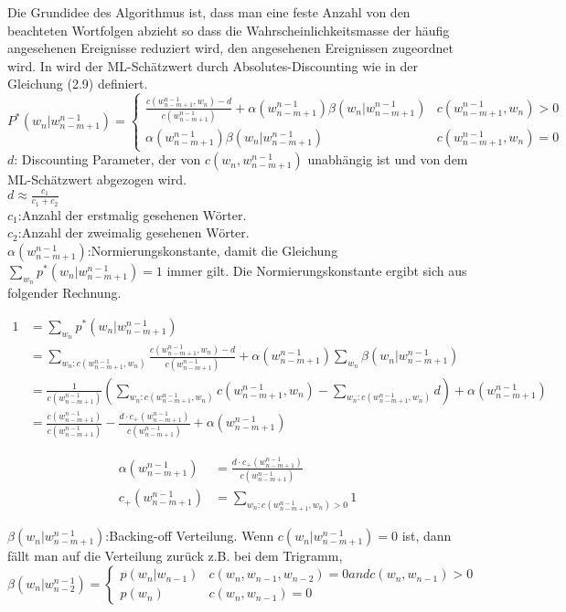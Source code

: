 Die Grundidee des Algorithmus ist, dass man eine feste Anzahl von den beachteten Wortfolgen abzieht so dass die Wahrscheinlichkeitsmasse der h\"aufig angesehenen Ereignisse reduziert wird, den angesehenen Ereignissen zugeordnet wird. In \cite{ars_script} wird der ML-Sch\"atzwert durch Absolutes-Discounting wie in der Gleichung (2.9) definiert.
\begin{equation}
P^{*}(w_{n}|w_{n-m+1}^{n-1})=\begin{cases}
\frac{c(w_{n-m+1}^{n-1},w_{n})-d}{c(w_{n-m+1}^{n-1})}+\alpha (w_{n-m+1}^{n-1})\beta (w_{n}|w_{n-m+1}^{n-1}) & c(w_{n-m+1}^{n-1},w_{n})>0 \\
\alpha (w_{n-m+1}^{n-1})\beta (w_{n}|w_{n-m+1}^{n-1}) & c(w_{n-m+1}^{n-1},w_{n})=0 
\end{cases}
\end{equation}
$d$: Discounting Parameter, der von $c(w_{n},w_{n-m+1}^{n-1})$ unabh\"angig ist und von dem ML-Sch\"atzwert abgezogen wird.\\
$d\approx \frac{c_{1}}{c_{1}+c_{2}}$ \\
$c_{1}$:Anzahl der erstmalig gesehenen W\"orter.\\
$c_{2}$:Anzahl der zweimalig gesehenen W\"orter.\\
$\alpha (w_{n-m+1}^{n-1})$:Normierungskonstante, damit die Gleichung $\sum_{w_{n}}p^{*}(w_{n}|w_{n-m+1}^{n-1})=1$ immer gilt. Die Normierungskonstante ergibt sich aus folgender Rechnung.

\begin{align}
1 &=\sum_{w_{n}}p^{*}(w_{n}|w_{n-m+1}^{n-1})\nonumber\\
&=\sum_{w_{n}:c(w_{n-m+1}^{n-1},w_{n})}\frac{c(w_{n-m+1}^{n-1},w_{n})-d}{c(w_{n-m+1}^{n-1})}+\alpha(w_{n-m+1}^{n-1})\sum_{w_{n}}\beta (w_{n}|w_{n-m+1}^{n-1}) \nonumber\\
&=\frac{1}{c(w_{n-m+1}^{n-1})}(\sum_{w_{n}:c(w_{n-m+1}^{n-1},w_{n})}c(w_{n-m+1}^{n-1},w_{n})-\sum_{w_{n}:c(w_{n-m+1}^{n-1},w_{n})}d)+\alpha (w_{n-m+1}^{n-1}) \nonumber\\
&=\frac{c(w_{n-m+1}^{n-1})}{c(w_{n-m+1}^{n-1})}-\frac{d\cdot c_{+}(w_{n-m+1}^{n-1})}{c(w_{n-m+1}^{n-1})}+\alpha (w_{n-m+1}^{n-1})
\end{align}

\begin{align}
\alpha (w_{n-m+1}^{n-1}) &=\frac{d\cdot c_{+}(w_{n-m+1}^{n-1})}{c(w_{n-m+1}^{n-1})}\\
c_{+}(w_{n-m+1}^{n-1}) &=\sum_{w_{n}:c(w_{n-m+1}^{n-1},w_{n})>0}1
\end{align}


$\beta (w_{n}|w_{n-m+1}^{n-1})$:Backing-off Verteilung. Wenn $c(w_{n}|w_{n-m+1}^{n-1})=0$ ist, dann f\"allt man auf die Verteilung zur\"uck
z.B. bei dem Trigramm,\\

\begin{equation}
\beta (w_{n}|w_{n-2}^{n-1})=\begin{cases}
p(w_{n}|w_{n-1}) & c(w_{n},w_{n-1},w_{n-2})=0 and c(w_{n},w_{n-1})>0 \\
p(w_{n}) & c(w_{n},w_{n-1})=0 
\end{cases}
\end{equation}

